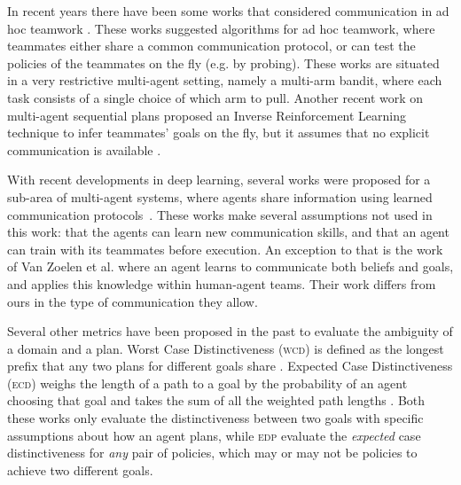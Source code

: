 \documentclass[letterpaper]{article}
\begin{document}
In recent years there have been some works that considered communication in ad hoc teamwork \cite{barrett2014communicating,chakraborty2017coordinated}. 
These works suggested algorithms for ad hoc teamwork, where teammates either share a common communication protocol, or can test the policies of the teammates on the fly (e.g. by probing). 
These works are situated in a very restrictive multi-agent setting, namely a multi-arm bandit, where each task consists of a single choice of which arm to pull. Another recent work on multi-agent sequential plans proposed an Inverse Reinforcement Learning technique to infer teammates' goals on the fly, but it assumes that no explicit communication is available \cite{wang2020too}.

With recent developments in deep learning, several works were proposed for a sub-area of multi-agent systems, where agents share information using learned communication protocols~\cite{hernandez2019survey,mordatch2018emergence,foerster2016learning}. These works make several assumptions not used in this work: that the agents can learn new communication skills, and that an agent can train with its teammates before execution. An exception to that is the work of Van Zoelen et al.  where an agent learns to communicate both beliefs and goals, and applies this knowledge within human-agent teams. Their work differs from ours in the type of communication they allow.

Several other metrics have been proposed in the past to evaluate the ambiguity of a domain and a plan. Worst Case Distinctiveness (\textsc{wcd}) is defined as the longest prefix that any two plans for different goals share \cite{keren2014goal}. Expected Case Distinctiveness (\textsc{ecd}) weighs the length of a path to a goal by the probability of an agent choosing that goal and takes the sum of all the weighted path lengths \cite{wayllace2017new}. Both these works only evaluate the distinctiveness between two goals with specific assumptions about how an agent plans, while \textsc{edp} evaluate the \emph{expected} case distinctiveness for \emph{any} pair of policies, which may or may not be policies to achieve two different goals. 
\end{document}
